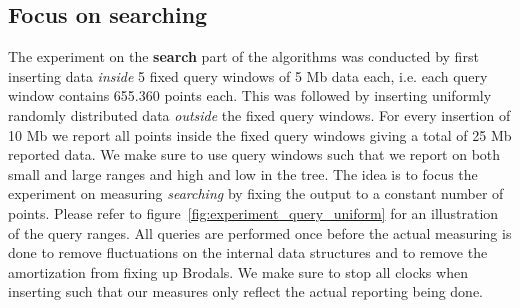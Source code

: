 \documentclass[twoside,11pt,openright]{report}
\begin{document}
\subsection{Focus on searching}
The experiment on the \textbf{search} part of the algorithms was conducted by first inserting data \textit{inside} 5 fixed query windows of 5 Mb data each, i.e. each query window contains 655.360 points each. This was followed by inserting uniformly randomly distributed data \textit{outside} the fixed query windows. For every insertion of 10 Mb we report all points inside the fixed query windows giving a total of 25 Mb reported data. We make sure to use query windows such that we report on both small and large ranges and high and low in the tree. The idea is to focus the experiment on measuring \textit{searching} by fixing the output to a constant number of points. Please refer to figure~\ref{fig:experiment_query_uniform} for an illustration of the query ranges. All queries are performed once before the actual measuring is done to remove fluctuations on the internal data structures and to remove the amortization from fixing up Brodals. We make sure to stop all clocks when inserting such that our measures only reflect the actual reporting being done.
\end{document}

